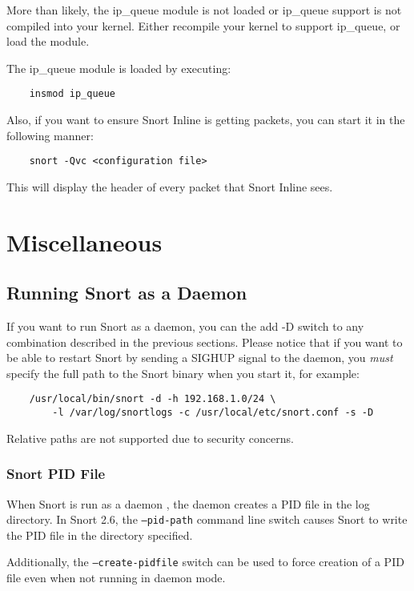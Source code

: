 \documentclass[english]{report}
\begin{document}
More than likely, the ip\_queue module is not loaded or ip\_queue support is
not compiled into your kernel.  Either recompile your kernel to support
ip\_queue, or load the module.

The ip\_queue module is loaded by executing:

\begin{verbatim}
    insmod ip_queue
\end{verbatim}

Also, if you want to ensure Snort Inline is getting packets, you can start it
in the following manner:

\begin{verbatim}
    snort -Qvc <configuration file>
\end{verbatim}

This will display the header of every packet that Snort Inline sees. 

\section{Miscellaneous}

\subsection{Running Snort as a Daemon}

If you want to run Snort as a daemon, you can the add -D switch to any
combination described in the previous sections. Please notice that if you want
to be able to restart Snort by sending a SIGHUP signal to the daemon, you {\em
must} specify the full path to the Snort binary when you start it, for example:

\begin{verbatim}
    /usr/local/bin/snort -d -h 192.168.1.0/24 \
        -l /var/log/snortlogs -c /usr/local/etc/snort.conf -s -D
\end{verbatim}

Relative paths are not supported due to security concerns.

\subsubsection{Snort PID File}

When Snort is run as a daemon , the daemon creates a PID file in the log
directory.  In Snort 2.6, the \texttt{--pid-path} command line switch causes
Snort to write the PID file in the directory specified.

Additionally, the \texttt{--create-pidfile} switch can be used to force
creation of a PID file even when not running in daemon mode.
\end{document}
